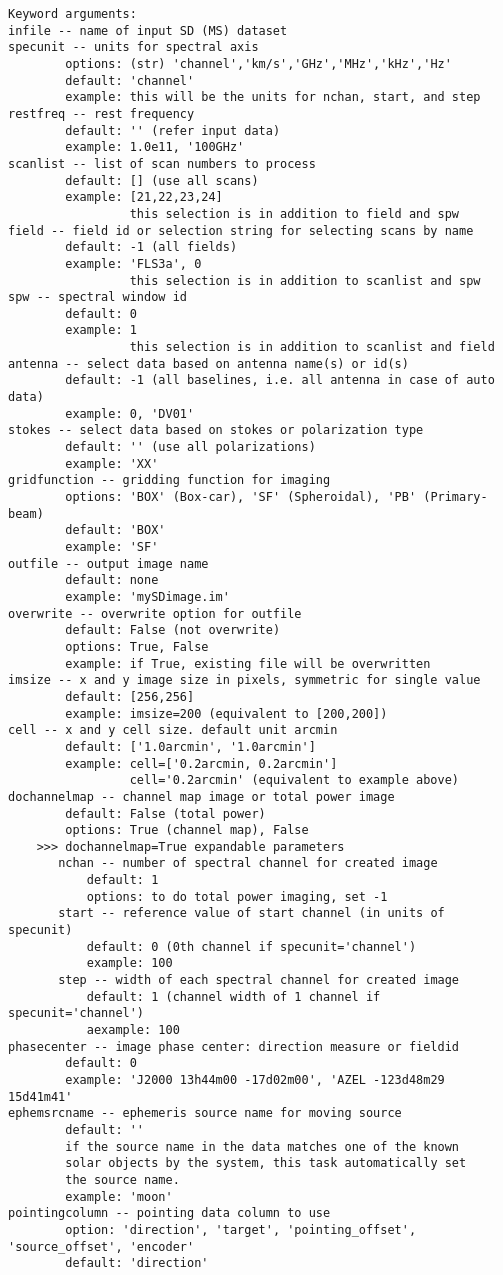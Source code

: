 \begin{verbatim}
Keyword arguments:
infile -- name of input SD (MS) dataset
specunit -- units for spectral axis
        options: (str) 'channel','km/s','GHz','MHz','kHz','Hz'
        default: 'channel'
        example: this will be the units for nchan, start, and step
restfreq -- rest frequency
        default: '' (refer input data)
        example: 1.0e11, '100GHz'
scanlist -- list of scan numbers to process
        default: [] (use all scans)
        example: [21,22,23,24]
                 this selection is in addition to field and spw
field -- field id or selection string for selecting scans by name
        default: -1 (all fields)
        example: 'FLS3a', 0
                 this selection is in addition to scanlist and spw
spw -- spectral window id
        default: 0
        example: 1
                 this selection is in addition to scanlist and field
antenna -- select data based on antenna name(s) or id(s)
        default: -1 (all baselines, i.e. all antenna in case of auto data)
        example: 0, 'DV01'
stokes -- select data based on stokes or polarization type 
        default: '' (use all polarizations)
        example: 'XX'
gridfunction -- gridding function for imaging
        options: 'BOX' (Box-car), 'SF' (Spheroidal), 'PB' (Primary-beam)
        default: 'BOX'
        example: 'SF'
outfile -- output image name
        default: none
        example: 'mySDimage.im'
overwrite -- overwrite option for outfile
        default: False (not overwrite)
        options: True, False
        example: if True, existing file will be overwritten
imsize -- x and y image size in pixels, symmetric for single value
        default: [256,256]
        example: imsize=200 (equivalent to [200,200])
cell -- x and y cell size. default unit arcmin
        default: ['1.0arcmin', '1.0arcmin']
        example: cell=['0.2arcmin, 0.2arcmin']
                 cell='0.2arcmin' (equivalent to example above)
dochannelmap -- channel map image or total power image
        default: False (total power)
        options: True (channel map), False
    >>> dochannelmap=True expandable parameters
       nchan -- number of spectral channel for created image
           default: 1 
           options: to do total power imaging, set -1 
       start -- reference value of start channel (in units of specunit)
           default: 0 (0th channel if specunit='channel')
           example: 100
       step -- width of each spectral channel for created image
           default: 1 (channel width of 1 channel if specunit='channel')
           aexample: 100
phasecenter -- image phase center: direction measure or fieldid 
        default: 0
        example: 'J2000 13h44m00 -17d02m00', 'AZEL -123d48m29 15d41m41'
ephemsrcname -- ephemeris source name for moving source
        default: ''
        if the source name in the data matches one of the known 
        solar objects by the system, this task automatically set 
        the source name. 
        example: 'moon' 
pointingcolumn -- pointing data column to use
        option: 'direction', 'target', 'pointing_offset', 'source_offset', 'encoder' 
        default: 'direction'
\end{verbatim}

